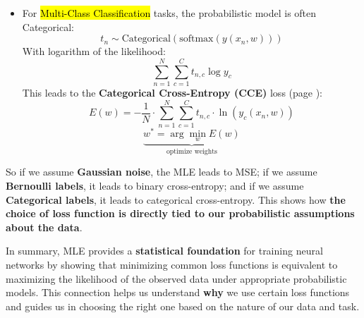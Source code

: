 \begin{enumerate}
\begin{itemize}
        \item For \hl{Multi-Class Classification} tasks, the probabilistic model is often Categorical:
        \begin{equation*}
            t_{n} \sim \text{Categorical}\left(\mathrm{softmax}(y\left(x_{n}, w\right))\right)
        \end{equation*}
        With logarithm of the likelihood:
        \begin{equation*}
            \sum_{n=1}^{N} \sum_{c=1}^{C} t_{n,c} \log y_{c}
        \end{equation*}
        This leads to the \textbf{Categorical Cross-Entropy (CCE)} loss (page \pageref{eq:cce-loss}):
        \begin{equation*}
            E(w) = -\dfrac{1}{N} \cdot \sum_{n=1}^{N} \sum_{c=1}^{C} t_{n,c} \cdot \ln\left(y_{c}\left(x_{n}, w\right)\right)
        \end{equation*}
        \begin{equation*}
            \underbrace{w^{*} = \arg\min_{w} E(w)}_{\text{optimize weights}}
        \end{equation*}
    \end{itemize}
    So if we assume \textbf{Gaussian noise}, the MLE leads to MSE; if we assume \textbf{Bernoulli labels}, it leads to binary cross-entropy; and if we assume \textbf{Categorical labels}, it leads to categorical cross-entropy. This shows how \textbf{the choice of loss function is directly tied to our probabilistic assumptions about the data}.
\end{enumerate}
In summary, MLE provides a \textbf{statistical foundation} for training neural networks by showing that minimizing common loss functions is equivalent to maximizing the likelihood of the observed data under appropriate probabilistic models. This connection helps us understand \textbf{why} we use certain loss functions and guides us in choosing the right one based on the nature of our data and task.

